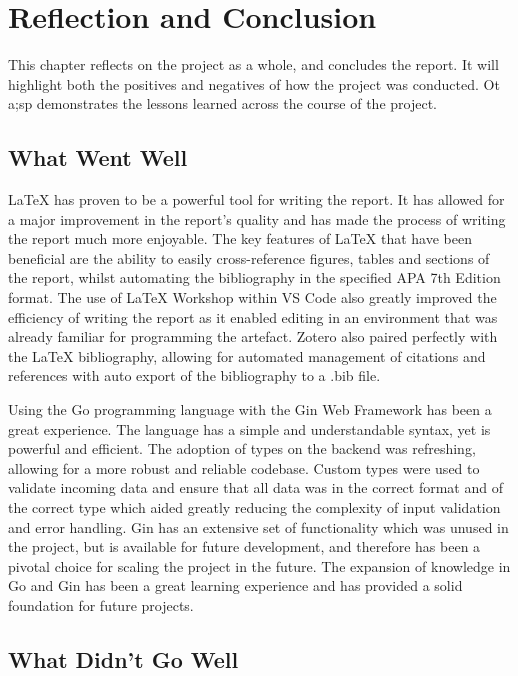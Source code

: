 \chapter{Reflection and Conclusion}
\label{chap:reflection-and-conclusion}

This chapter reflects on the project as a whole, and concludes the report. It will highlight both the positives and negatives of how the project was conducted. Ot a;sp demonstrates the lessons learned across the course of the project.

\label{reflection-and-conclusion:what-went-well}
\section{What Went Well}

LaTeX has proven to be a powerful tool for writing the report. It has allowed for a major improvement in the report's quality and has made the process of writing the report much more enjoyable. The key features of LaTeX that have been beneficial are the ability to easily cross-reference figures, tables and sections of the report, whilst automating the bibliography in the specified APA 7th Edition format. The use of LaTeX Workshop within VS Code also greatly improved the efficiency of writing the report as it enabled editing in an environment that was already familiar for programming the artefact. Zotero also paired perfectly with the LaTeX bibliography, allowing for automated management of citations and references with auto export of the bibliography to a .bib file.

Using the Go programming language with the Gin Web Framework has been a great experience. The language has a simple and understandable syntax, yet is powerful and efficient. The adoption of types on the backend was refreshing, allowing for a more robust and reliable codebase. Custom types were used to validate incoming data and ensure that all data was in the correct format and of the correct type which aided greatly reducing the complexity of input validation and error handling. Gin has an extensive set of functionality which was unused in the project, but is available for future development, and therefore has been a pivotal choice for scaling the project in the future. The expansion of knowledge in Go and Gin has been a great learning experience and has provided a solid foundation for future projects.

\label{reflection-and-conclusion:what-didnt-go-well}
\section{What Didn't Go Well}

